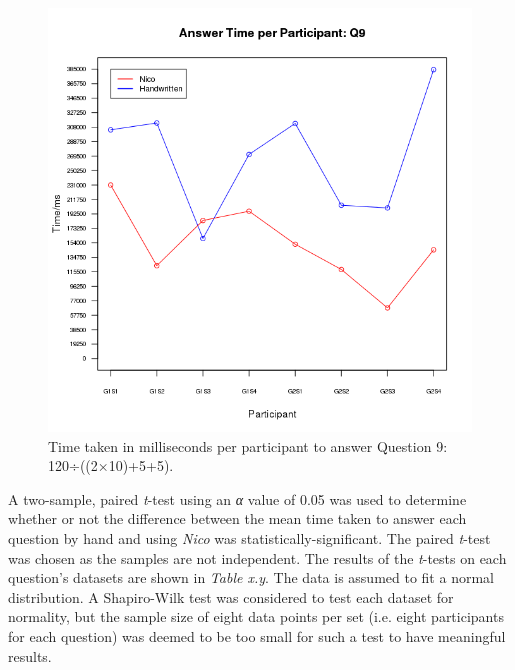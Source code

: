 \documentclass[12pt,twoside,notitlepage,xetex]{report}
\begin{document}
\begin{center}
\begin{figure}[H]
\begin{center}
\includegraphics[width=\textwidth-2cm]{figs/graphs/q9.png}
\end{center}
\caption{Time taken in milliseconds per participant to answer Question 9: 120÷((2×10)+5+5).}
\label{fig:PlotQ9}
\end{figure}
\end{center}

A two-sample, paired \emph{t}-test using an \emph{α} value of 0.05 was used to
determine whether or not the difference between the mean time taken to answer
each question by hand and using \emph{Nico} was statistically-significant.  The
paired \emph{t}-test was chosen as the samples are not independent.  The
results of the \emph{t}-tests on each question's datasets are shown in
\emph{Table x.y}.  The data is assumed to fit a normal distribution.  A
Shapiro-Wilk test was considered to test each dataset for normality, but the
sample size of eight data points per set (i.e. eight participants for each
question) was deemed to be too small for such a test to have meaningful results.
\end{document}
